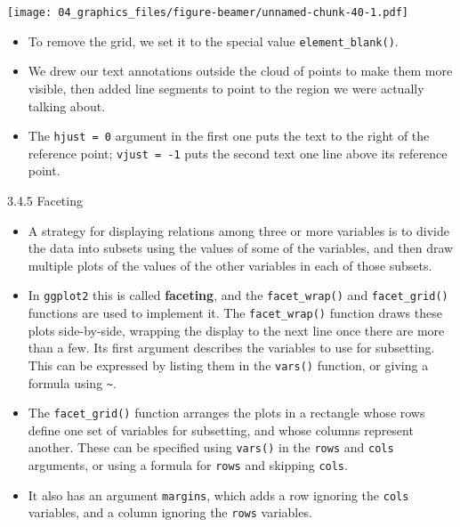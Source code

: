 \documentclass[
  9pt,
  a4paper,
  ignorenonframetext,
  notheorems]{beamer}
\begin{document}
\begin{frame}[fragile]
\texttt{[image: 04\_graphics\_files/figure-beamer/unnamed-chunk-40-1.pdf]}

\begin{itemize}
\item
  To remove the grid, we set it to the special value
  \texttt{element\_blank()}.
\item
  We drew our text annotations outside the cloud of points to make them
  more visible, then added line segments to point to the region we were
  actually talking about.
\item
  The \texttt{hjust\ =\ 0} argument in the first one puts the text to
  the right of the reference point; \texttt{vjust\ =\ -1} puts the
  second text one line above its reference point.
\end{itemize}
\end{frame}

\begin{frame}[fragile]
\begin{block}{3.4.5 Faceting}
\protect\hypertarget{faceting}{}
\begin{itemize}
\item
  A strategy for displaying relations among three or more variables is
  to divide the data into subsets using the values of some of the
  variables, and then draw multiple plots of the values of the other
  variables in each of those subsets.
\item
  In \texttt{ggplot2} this is called \textbf{faceting}, and the
  \texttt{facet\_wrap()} and \texttt{facet\_grid()} functions are used
  to implement it. The \texttt{facet\_wrap()} function draws these plots
  side-by-side, wrapping the display to the next line once there are
  more than a few. Its first argument describes the variables to use for
  subsetting. This can be expressed by listing them in the
  \texttt{vars()} function, or giving a formula using
  \texttt{\textasciitilde{}}.
\item
  The \texttt{facet\_grid()} function arranges the plots in a rectangle
  whose rows define one set of variables for subsetting, and whose
  columns represent another. These can be specified using
  \texttt{vars()} in the \texttt{rows} and \texttt{cols} arguments, or
  using a formula for \texttt{rows} and skipping \texttt{cols}.
\item
  It also has an argument \texttt{margins}, which adds a row ignoring
  the \texttt{cols} variables, and a column ignoring the \texttt{rows}
  variables.
\end{itemize}
\end{block}
\end{frame}
\end{document}

